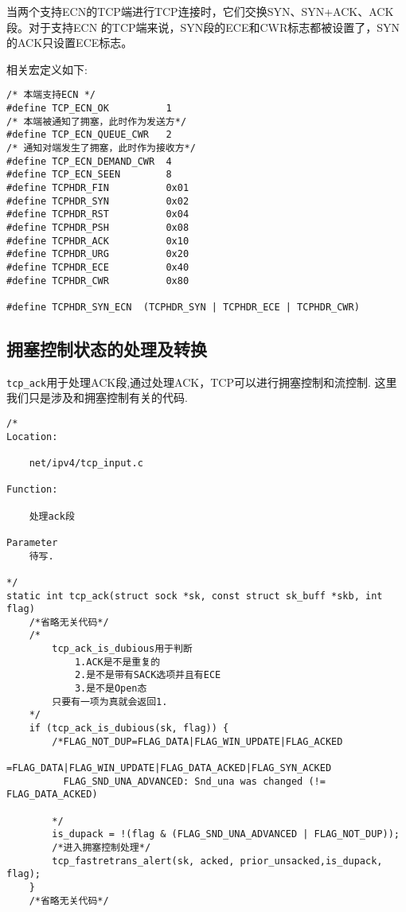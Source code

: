 			当两个支持ECN的TCP端进行TCP连接时，它们交换SYN、SYN+ACK、ACK段。对于支持ECN
			的TCP端来说，SYN段的ECE和CWR标志都被设置了，SYN的ACK只设置ECE标志。

			相关宏定义如下:
\begin{verbatim}
/* 本端支持ECN */  
#define	TCP_ECN_OK			1
/* 本端被通知了拥塞，此时作为发送方*/
#define	TCP_ECN_QUEUE_CWR	2
/* 通知对端发生了拥塞，此时作为接收方*/
#define	TCP_ECN_DEMAND_CWR	4
#define	TCP_ECN_SEEN		8
#define TCPHDR_FIN 			0x01
#define TCPHDR_SYN 			0x02
#define TCPHDR_RST 			0x04
#define TCPHDR_PSH			0x08
#define TCPHDR_ACK 			0x10
#define TCPHDR_URG 			0x20
#define TCPHDR_ECE 			0x40
#define TCPHDR_CWR 			0x80

#define TCPHDR_SYN_ECN	(TCPHDR_SYN | TCPHDR_ECE | TCPHDR_CWR)
\end{verbatim}

	\subsection{拥塞控制状态的处理及转换}
		\texttt{tcp_ack}用于处理ACK段,通过处理ACK，TCP可以进行拥塞控制和流控制.
		这里我们只是涉及和拥塞控制有关的代码.
\begin{verbatim}
/*
Location:

	net/ipv4/tcp_input.c

Function:

	处理ack段

Parameter
	待写.
		
*/
static int tcp_ack(struct sock *sk, const struct sk_buff *skb, int flag)
	/*省略无关代码*/
	/*
		tcp_ack_is_dubious用于判断
			1.ACK是不是重复的
			2.是不是带有SACK选项并且有ECE	
			3.是不是Open态
		只要有一项为真就会返回1.
	*/
	if (tcp_ack_is_dubious(sk, flag)) {
		/*FLAG_NOT_DUP=FLAG_DATA|FLAG_WIN_UPDATE|FLAG_ACKED
					  =FLAG_DATA|FLAG_WIN_UPDATE|FLAG_DATA_ACKED|FLAG_SYN_ACKED
		  FLAG_SND_UNA_ADVANCED: Snd_una was changed (!= FLAG_DATA_ACKED) 

		*/		
		is_dupack = !(flag & (FLAG_SND_UNA_ADVANCED | FLAG_NOT_DUP));
		/*进入拥塞控制处理*/
		tcp_fastretrans_alert(sk, acked, prior_unsacked,is_dupack, flag);
	}
	/*省略无关代码*/
\end{verbatim}
